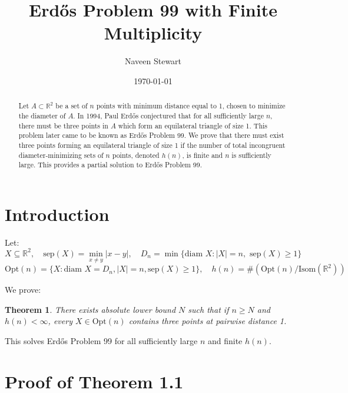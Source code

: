 \documentclass[10pt,reqno]{amsart}
\newtheorem{theorem}{Theorem}[section]
\begin{document}
\title{Erd\H{o}s Problem 99 with Finite Multiplicity} %
\author[N Stewart]{Naveen Stewart}
\date{\today}
\maketitle

\let\thefootnote\relax

\begin{abstract}
Let $A \subset \mathbb{R}^2$ be a set of $n$ points with minimum distance equal to 1, chosen to minimize the diameter of $A$. In 1994, Paul Erd\H{o}s conjectured that for all sufficiently large $n$, there must be three points in $A$ which form an equilateral triangle of size 1. This problem later came to be known as Erd\H{o}s Problem 99. We prove that there must exist three points forming an equilateral triangle of size 1 if the number of total incongruent diameter-minimizing sets of $n$ points, denoted $h(n)$, is finite and $n$ is sufficiently large. This provides a partial solution to Erd\H{o}s Problem 99.
\end{abstract}

\section{Introduction}

Let:
\begin{equation}
    X \subseteq \mathbb{R}^2, \quad \text{sep}(X) = \min_{x \ne y} |x - y|, \quad D_n = \min \{\text{diam } X : |X| = n, \text{ sep}(X) \ge 1\}
\end{equation}
\begin{equation}
    \text{Opt}(n) = \{X : \text{diam } X = D_n, |X| = n, \text{sep} (X) \ge 1\}, \quad h(n) = \# (\text{Opt}(n) / \text{Isom}(\mathbb{R}^2))
\end{equation}

We prove:
\begin{theorem}
    There exists absolute lower bound $N$ such that if $n \ge N$ and $h(n) < \infty$, every $X \in \text{Opt}(n)$ contains three points at pairwise distance 1.
\end{theorem}
This solves Erd\H{o}s Problem 99 \cite{1} for all sufficiently large $n$ and finite $h(n)$.


\section{Proof of Theorem 1.1}
\end{document}
